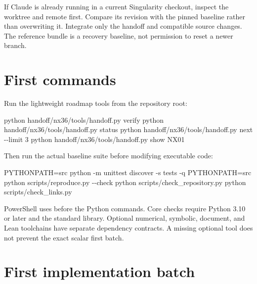 \documentclass[
  11pt,
  a4paper,
]{report}
\newenvironment{Shaded}{}{}
\newcommand{\AttributeTok}[1]{\textcolor[rgb]{0.49,0.56,0.16}{#1}}
\newcommand{\ExtensionTok}[1]{#1}
\newcommand{\NormalTok}[1]{#1}
\newcommand{\OperatorTok}[1]{\textcolor[rgb]{0.40,0.40,0.40}{#1}}
\newcommand{\VariableTok}[1]{\textcolor[rgb]{0.10,0.09,0.49}{#1}}
\let\nxtexttt\texttt
\renewcommand{\texttt}[1]{\nxtexttt{\seqsplit{#1}}}
\begin{document}
If Claude is already running in a current Singularity checkout, inspect
the worktree and remote first. Compare its revision with the pinned
baseline rather than overwriting it. Integrate only the handoff and
compatible source changes. The reference bundle is a recovery baseline,
not permission to reset a newer branch.

\hypertarget{first-commands}{%
\section{First commands}\label{first-commands}}

Run the lightweight roadmap tools from the repository root:

\begin{Shaded}
\begin{Highlighting}[]
\ExtensionTok{python}\NormalTok{ handoff/nx36/tools/handoff.py verify}
\ExtensionTok{python}\NormalTok{ handoff/nx36/tools/handoff.py status}
\ExtensionTok{python}\NormalTok{ handoff/nx36/tools/handoff.py next }\AttributeTok{{-}{-}limit}\NormalTok{ 3}
\ExtensionTok{python}\NormalTok{ handoff/nx36/tools/handoff.py show NX01}
\end{Highlighting}
\end{Shaded}

Then run the actual baseline suite before modifying executable code:

\begin{Shaded}
\begin{Highlighting}[]
\VariableTok{PYTHONPATH}\OperatorTok{=}\NormalTok{src }\ExtensionTok{python} \AttributeTok{{-}m}\NormalTok{ unittest discover }\AttributeTok{{-}s}\NormalTok{ tests }\AttributeTok{{-}q}
\VariableTok{PYTHONPATH}\OperatorTok{=}\NormalTok{src }\ExtensionTok{python}\NormalTok{ scripts/reproduce.py }\AttributeTok{{-}{-}check}
\ExtensionTok{python}\NormalTok{ scripts/check\_repository.py}
\ExtensionTok{python}\NormalTok{ scripts/check\_links.py}
\end{Highlighting}
\end{Shaded}

PowerShell uses
\texttt{\$env:PYTHONPATH=\textquotesingle{}src\textquotesingle{}} before
the Python commands. Core checks require Python 3.10 or later and the
standard library. Optional numerical, symbolic, document, and Lean
toolchains have separate dependency contracts. A missing optional tool
does not prevent the exact scalar first batch.

\hypertarget{first-implementation-batch}{%
\section{First implementation batch}\label{first-implementation-batch}}
\end{document}
